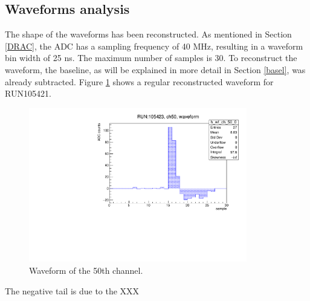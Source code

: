 \subsection{Waveforms analysis}\label{wf}
The shape of the waveforms has been reconstructed. As mentioned in Section \ref{DRAC}, 
the ADC has a sampling frequency of 40 MHz, resulting in a waveform bin width of 25 ns. 
The maximum number of samples is 30. To reconstruct the waveform, the baseline, as will be 
explained in more detail in Section \ref{basel}, was already subtracted.
Figure \ref{fig:normalwf} shows a regular reconstructed waveform for RUN105421.
\begin{figure}[!h]
  \centering
  \includegraphics[width=0.85\textwidth]{figures/pdf/wf_ch50_0.pdf}
  \caption{Waveform of the 50th channel.}
 \label{fig:normalwf}
\end{figure}
The negative tail is due to the XXX

